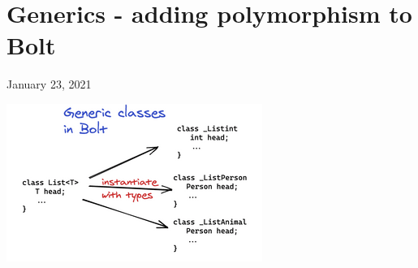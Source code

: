 %
%
%
%
%
%

\hypertarget{top-of-page}{%
\chapter{Generics - adding polymorphism to Bolt}\label{top-of-page}}

January 23, 2021

%

\includegraphics[width=\linewidth]{10_files/generics.png}

